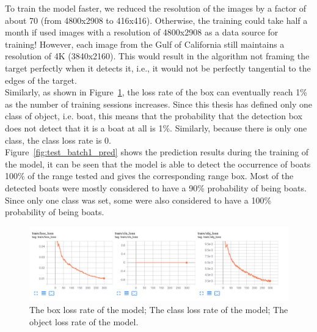 To train the model faster, we reduced the resolution of the images by a factor of about 70 (from 4800x2908 to 416x416). Otherwise, the training could take half a month if used images with a resolution of 4800x2908 as a data source for training! However, each image from the Gulf of California still maintains a resolution of 4K (3840x2160). This would result in the algorithm not framing the target perfectly when it detects it, i.e., it would not be perfectly tangential to the edges of the target. \\

Similarly, as shown in Figure~\ref{fig:colab_train}, the loss rate of the box can eventually reach 1\% as the number of training sessions increases. Since this thesis has defined only one class of object, i.e. boat, this means that the probability that the detection box does not detect that it is a boat at all is 1\%. Similarly, because there is only one class, the class loss rate is 0.\\

Figure~\ref{fig:test_batch1_pred} shows the prediction results during the training of the model, it can be seen that the model is able to detect the occurrence of boats 100\% of the range tested and gives the corresponding range box. Most of the detected boats were mostly considered to have a 90\% probability of being boats. Since only one class was set, some were also considered to have a 100\% probability of being boats.



\begin{figure}[h]
    \centering
    \includegraphics[scale=0.43]{img/colab_train.png}
    \caption{The box loss rate of the model; The class loss rate of the model; The object loss rate of the model.}
    \label{fig:colab_train}
\end{figure}

